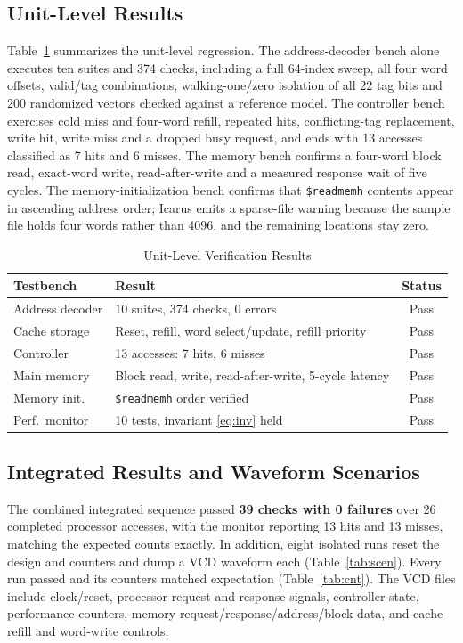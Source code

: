 \documentclass[conference,a4paper]{IEEEtran}
\begin{document}
\subsection{Unit-Level Results}\label{sec:unit}
Table~\ref{tab:unit} summarizes the unit-level regression. The address-decoder bench alone executes ten suites and 374 checks, including a full 64-index sweep, all four word offsets, valid/tag combinations, walking-one/zero isolation of all 22 tag bits and 200 randomized vectors checked against a reference model. The controller bench exercises cold miss and four-word refill, repeated hits, conflicting-tag replacement, write hit, write miss and a dropped busy request, and ends with 13 accesses classified as 7 hits and 6 misses. The memory bench confirms a four-word block read, exact-word write, read-after-write and a measured response wait of five cycles. The memory-initialization bench confirms that \texttt{\$readmemh} contents appear in ascending address order; Icarus emits a sparse-file warning because the sample file holds four words rather than 4096, and the remaining locations stay zero.

\begin{table}[!t]
\caption{Unit-Level Verification Results}\label{tab:unit}
\centering
\renewcommand{\arraystretch}{1.1}
\begin{tabular}{@{}lp{4.3cm}c@{}}
\toprule
\textbf{Testbench} & \textbf{Result} & \textbf{Status}\\
\midrule
Address decoder & 10 suites, 374 checks, 0 errors & Pass\\
Cache storage & Reset, refill, word select/update, refill priority & Pass\\
Controller & 13 accesses: 7 hits, 6 misses & Pass\\
Main memory & Block read, write, read-after-write, 5-cycle latency & Pass\\
Memory init. & \texttt{\$readmemh} order verified & Pass\\
Perf.\ monitor & 10 tests, invariant \eqref{eq:inv} held & Pass\\
\bottomrule
\end{tabular}
\end{table}

\subsection{Integrated Results and Waveform Scenarios}\label{sec:integ}
The combined integrated sequence passed \textbf{39 checks with 0 failures} over 26 completed processor accesses, with the monitor reporting 13 hits and 13 misses, matching the expected counts exactly. In addition, eight isolated runs reset the design and counters and dump a VCD waveform each (Table~\ref{tab:scen}). Every run passed and its counters matched expectation (Table~\ref{tab:cnt}). The VCD files include clock/reset, processor request and response signals, controller state, performance counters, memory request/response/address/block data, and cache refill and word-write controls.
\end{document}
